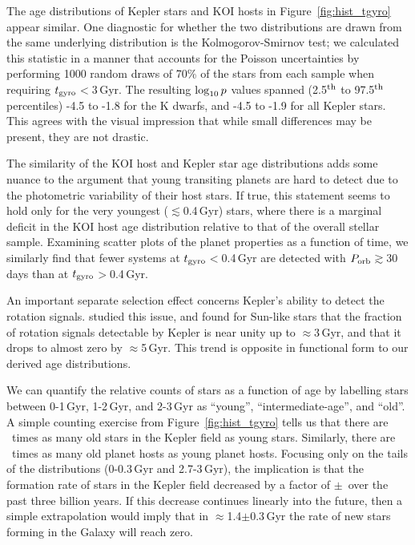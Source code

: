 \documentclass[11pt,twocolumn,tighten]{aastex63}
\begin{document}
The age distributions of Kepler stars and KOI hosts in
Figure~\ref{fig:hist_tgyro} appear similar.  One diagnostic for
whether the two distributions are drawn from the same underlying
distribution is the Kolmogorov-Smirnov test;  we calculated this
statistic in a manner that accounts for the Poisson uncertainties by
performing 1000 random draws of 70\% of the stars from each sample
when requiring $t_{\rm gyro}$$<$3\,Gyr.  The resulting $\log_{\rm
10}p$ values spanned (2.5$^{\rm th}$ to 97.5$^{\rm th}$ percentiles)
-4.5 to -1.8 for the K dwarfs, and -4.5 to -1.9 for all Kepler stars.
This agrees with the visual impression that while small differences
may be present, they are not drastic.

The similarity of the KOI host and Kepler star age distributions adds
some nuance to the argument that young transiting planets are hard to
detect due to the photometric variability of their host stars.  If
true, this statement seems to hold only for the very youngest
($\lesssim$0.4\,Gyr) stars, where there is a marginal deficit in the
KOI host age distribution relative to that of the overall stellar
sample.  Examining scatter plots of the planet properties as a
function of time, we similarly find that fewer systems at $t_{\rm
gyro}$$<$0.4\,Gyr are detected with $P_{\rm orb}$$\gtrsim$30\,days
than at $t_{\rm gyro}$$>$0.4\,Gyr.

An important separate selection effect concerns Kepler's ability to
detect the rotation signals.  \citet{2022ApJ...937...94M} studied this
issue, and found for Sun-like stars that the fraction of rotation
signals detectable by Kepler is near unity up to $\approx$3\,Gyr, and
that it drops to almost zero by $\approx$5\,Gyr.  This trend is
opposite in functional form to our derived age distributions.

We can quantify the relative counts of stars as a function of age by
labelling stars between 0-1\,Gyr, 1-2\,Gyr, and 2-3\,Gyr as ``young'',
``intermediate-age'', and ``old''.  A simple counting exercise from
Figure~\ref{fig:hist_tgyro} tells us that there are \ratioobtoybstars\
times as many old stars in the Kepler field as young stars.
Similarly, there are \ratioobtoybplanets\ times as many old planet
hosts as young planet hosts.  Focusing only on the tails of the
distributions (0-0.3\,Gyr and 2.7-3\,Gyr), the implication is that the
formation rate of stars in the Kepler field decreased by a factor of
\ratiosfr$\pm$\uncratiosfr\ over the past three billion years.  If
this decrease continues linearly into the future, then a simple
extrapolation would imply that in $\approx$1.4$\pm$0.3\,Gyr the rate
of new stars forming in the Galaxy will reach zero.
\end{document}
